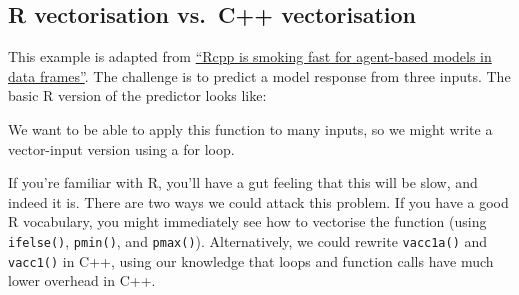 \subsection{R vectorisation vs.~C++ vectorisation}

This example is adapted from
\href{http://www.babelgraph.org/wp/?p=358}{``Rcpp is smoking fast for
agent-based models in data frames''}. The challenge is to predict a
model response from three inputs. The basic R version of the predictor
looks like:

\begin{Shaded}
\begin{Highlighting}[]
\StringTok{ }
  \StringTok{ } \NormalTok{+}\StringTok{ } \NormalTok{*}\StringTok{ } \NormalTok{/}\StringTok{ }\NormalTok{(} \NormalTok{-}\StringTok{ }\NormalTok{(} \NormalTok{*}\StringTok{ }\StringTok{ } \NormalTok{*}\StringTok{ }
  \StringTok{ }\StringTok{ } 
  \StringTok{ }\NormalTok{(}
  \StringTok{ }\NormalTok{(}
\NormalTok{\}}
\end{Highlighting}
\end{Shaded}

We want to be able to apply this function to many inputs, so we might
write a vector-input version using a for loop.

\begin{Shaded}
\begin{Highlighting}[]
\StringTok{ }
  \StringTok{ }
  \StringTok{ }
    \StringTok{ }
  \NormalTok{\}}
\NormalTok{\}}
\end{Highlighting}
\end{Shaded}

If you're familiar with R, you'll have a gut feeling that this will be
slow, and indeed it is. There are two ways we could attack this problem.
If you have a good R vocabulary, you might immediately see how to
vectorise the function (using \texttt{ifelse()}, \texttt{pmin()}, and
\texttt{pmax()}). Alternatively, we could rewrite \texttt{vacc1a()} and
\texttt{vacc1()} in C++, using our knowledge that loops and function
calls have much lower overhead in C++.

